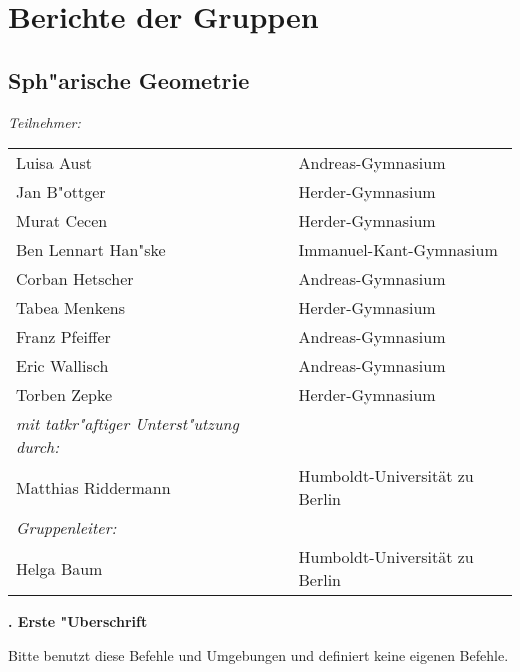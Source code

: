 \documentclass[10pt,a4paper, twoside]{article}
\newcounter{oursec}
\renewcommand*\theoursec{\arabic{oursec}. }
\newcommand{\oursec}[1]{\vspace{4ex}\stepcounter{oursec}%
{\Large\bf\theoursec #1\\[2ex]}}
\theoremstyle{definition}
\theoremstyle{plain}
\numberwithin{equation}{subsection}
\begin{document}
\pagebreak
\pagestyle{plain}
\section*{Berichte der Gruppen}

\subsection*{Sph"arische Geometrie}

\setcounter{Beispiel}{0}
\setcounter{equation}{0}

\setcounter{Satz}{0}
\setcounter{Lemma}{0}
\setcounter{Korollar}{0}
\setcounter{Definition}{0}
\setcounter{Bemerkung}{0}


\vspace{0,5cm}
\textit{Teilnehmer:}

\begin{tabular}{lp{3mm}l}
Luisa Aust&&Andreas-Gymnasium\\
Jan B"ottger&&Herder-Gymnasium\\
Murat Cecen&&Herder-Gymnasium\\
Ben Lennart Han"ske&&Immanuel-Kant-Gymnasium\\
Corban Hetscher&&Andreas-Gymnasium\\
Tabea Menkens&&Herder-Gymnasium\\
Franz Pfeiffer&&Andreas-Gymnasium\\
Eric Wallisch&&Andreas-Gymnasium\\
Torben Zepke&&Herder-Gymnasium\\[0,3cm]
\textit{mit tatkr"aftiger Unterst"utzung durch:}\\

Matthias Riddermann&& Humboldt-Universit\"at zu Berlin\\[0,3cm]

\textit{Gruppenleiter:}\\


Helga Baum&& Humboldt-Universit\"at zu Berlin\\
\end{tabular}
\begin{center}
\end{center}

\pagebreak

\oursec{Erste "Uberschrift}

Bitte benutzt diese Befehle und Umgebungen und definiert keine eigenen Befehle. 
\end{document}
